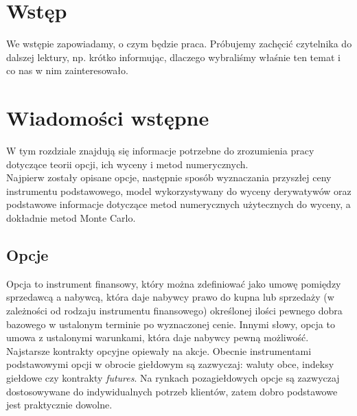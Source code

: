 \documentclass[]{pwr_wmat_praca_dyplomowa}
\theoremstyle{plain}
\numberwithin{theorem}{chapter}
\theoremstyle{definition}
\numberwithin{theorem}{chapter}
\begin{document}
\frontmatter
\maketitle
\mainmatter
\tableofcontents

{\backmatter \chapter{Wstęp}}
We wstępie zapowiadamy, o czym będzie praca. Próbujemy zachęcić czytelnika do dalszej lektury, np. krótko informując, dlaczego wybraliśmy właśnie ten temat i co nas w nim zainteresowało.

\chapter{Wiadomości wstępne}
W tym rozdziale znajdują się informacje potrzebne do zrozumienia pracy dotyczące teorii opcji, ich wyceny i metod numerycznych.\\
Najpierw zostały opisane opcje, następnie sposób wyznaczania przyszłej ceny instrumentu podstawowego, model wykorzystywany do wyceny derywatywów oraz podstawowe informacje dotyczące metod numerycznych użytecznych do wyceny, a dokładnie metod Monte Carlo.

\section{Opcje}
Opcja to instrument finansowy, który można zdefiniować jako umowę pomiędzy sprzedawcą a nabywcą, która daje nabywcy prawo do kupna lub sprzedaży (w zależności od rodzaju instrumentu finansowego) określonej ilości pewnego dobra bazowego w ustalonym terminie po wyznaczonej cenie. Innymi słowy, opcja to umowa z ustalonymi warunkami, która daje nabywcy pewną możliwość.
Najstarsze kontrakty opcyjne opiewały na akcje. Obecnie instrumentami podstawowymi opcji w obrocie giełdowym są zazwyczaj: waluty obce, indeksy giełdowe czy kontrakty \textit{futures}. Na rynkach pozagiełdowych opcje są zazwyczaj dostosowywane do indywidualnych potrzeb klientów, zatem dobro podstawowe jest praktycznie dowolne.\\
\end{document}
